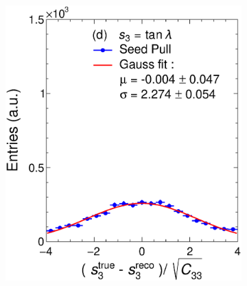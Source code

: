 \begin{figure}[t]
\begin{subfigure}{0.32\textwidth}
         \caption{}
         \label{fig:resp2Seed_GArLite_NoCorr}
     \end{subfigure}
          \begin{subfigure}{0.32\textwidth}
         \centering
         \includegraphics[width=\textwidth]{figures/ch4-KF_NDGArLite/Toy/NoCorr/UnitSeed_p3.eps}
         \caption{}
         \label{fig:resp3Seed_GArLite_NoCorr}
     \end{subfigure}
     \begin{subfigure}{0.32\textwidth}
         \centering

\end{subfigure}
\end{figure}
